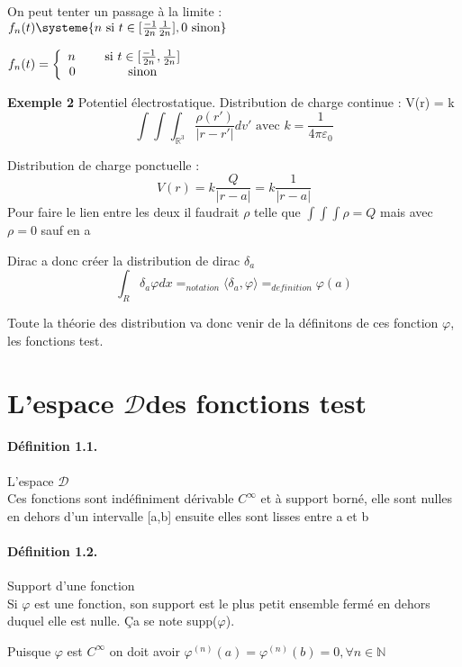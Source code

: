 \documentclass[12pt,a4paper]{report}
\newcommand{\D}{\ensuremath{\mathcal{D}}}
\begin{document}
On peut tenter un passage à la limite :\\
\(f_n(t) \systeme{n \text{ si } t \in [ \tfrac{-1}{2n} \tfrac{1}{2n} ],0 \text{ sinon} }\)

\(f_n(t) = \left \{
   \begin{array}{r c}
      n \quad &\text{ si } t \in [ \tfrac{-1}{2n}, \tfrac{1}{2n} ] \\
      0 \quad &\text{ sinon}
   \end{array}
   \right .\)

\textbf{Exemple 2} Potentiel électrostatique.
Distribution de charge continue : V(r) = k 
\[
	\int\int\int_{\mathbb{R}^3} \dfrac{\rho(r')}{\vert r- r'\vert} dv' \text{ avec } k = \dfrac{1}{4\pi\varepsilon_0} 
\]

Distribution de charge ponctuelle :
\[
	V(r) = k\dfrac{Q}{\vert r - a \vert} = k\dfrac{1}{\vert r - a \vert}
\]
Pour faire le lien entre les deux il faudrait \(\rho\) telle que \(\int\int\int \rho = Q\) mais avec \(\rho = 0\) sauf en a

Dirac a donc créer la distribution de dirac \(\delta_a\)
\[
	\int_R \delta_a \varphi dx =_{notation} \langle \delta_a, \varphi \rangle =_{definition} \varphi(a)
\]

Toute la théorie des distribution va donc venir de la définitons de ces fonction $\varphi$, les fonctions test.

\section{L'espace \D des fonctions test}

\paragraph{Définition 1.1.} L'espace \D\\
Ces fonctions sont indéfiniment dérivable $C^\infty$ et à support borné, elle sont nulles en dehors d'un intervalle [a,b] ensuite elles sont lisses entre a et b

\paragraph{Définition 1.2.} Support d'une fonction\\
Si \(\varphi\) est une fonction, son support est le plus petit ensemble fermé en dehors duquel elle est nulle. Ça se note supp(\(\varphi\)).

Puisque \(\varphi\) est \(C^{\infty}\) on doit avoir \(\varphi^{(n)}(a) = \varphi^{(n)}(b) = 0, \forall n \in \mathbb{N}\)
\end{document}
